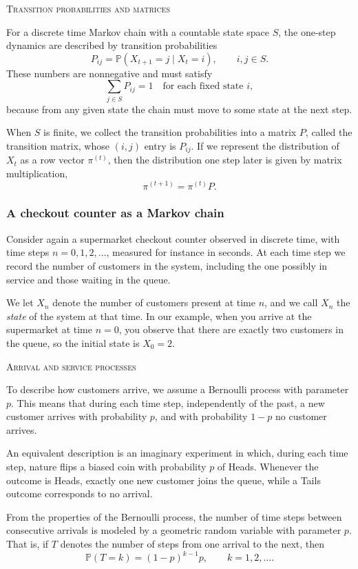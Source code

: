 \bigskip
\textsc{Transition probabilities and matrices}

For a discrete time Markov chain with a countable state space \(S\), the one-step dynamics are described by transition probabilities
\[
P_{ij}
=
\mathbb{P}(X_{t+1} = j \mid X_t = i),
\qquad
i,j \in S.
\]
These numbers are nonnegative and must satisfy
\[
\sum_{j \in S} P_{ij} = 1
\quad
\text{for each fixed state } i,
\]
because from any given state the chain must move to some state at the next step.

When \(S\) is finite, we collect the transition probabilities into a matrix \(P\), called the transition matrix, whose \((i,j)\) entry is \(P_{ij}\).
If we represent the distribution of \(X_t\) as a row vector \(\pi^{(t)}\), then the distribution one step later is given by matrix multiplication,
\[
\pi^{(t+1)}
=
\pi^{(t)} P.
\]


\subsubsection{A checkout counter as a Markov chain}

Consider again a supermarket checkout counter observed in discrete time, with time steps \(n = 0,1,2,\dots\), measured for instance in seconds.
At each time step we record the number of customers in the system, including the one possibly in service and those waiting in the queue.

We let \(X_n\) denote the number of customers present at time \(n\), and we call \(X_n\) the \textit{state} of the system at that time.
In our example, when you arrive at the supermarket at time \(n = 0\), you observe that there are exactly two customers in the queue, so the initial state is \(X_0 = 2\).

\bigskip
\textsc{Arrival and service processes}

To describe how customers arrive, we assume a Bernoulli process with parameter \(p\).
This means that during each time step, independently of the past, a new customer arrives with probability \(p\), and with probability \(1-p\) no customer arrives.

An equivalent description is an imaginary experiment in which, during each time step, nature flips a biased coin with probability \(p\) of Heads.
Whenever the outcome is Heads, exactly one new customer joins the queue, while a Tails outcome corresponds to no arrival.

From the properties of the Bernoulli process, the number of time steps between consecutive arrivals is modeled by a geometric random variable with parameter \(p\).
That is, if \(T\) denotes the number of steps from one arrival to the next, then
\[
\mathbb{P}(T = k)
=
(1-p)^{k-1} p,
\qquad
k = 1,2,\dots.
\]

